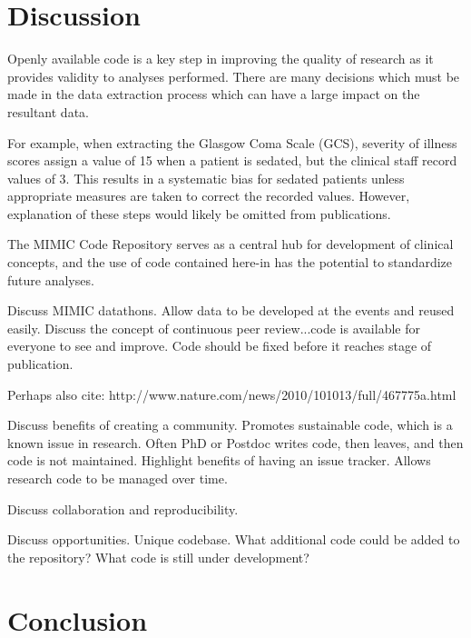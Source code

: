 \documentclass{bioinfo}
\begin{document}
\section{Discussion}



Openly available code is a key step in improving the quality of research as it provides validity to analyses performed. There are many decisions which must be made in the data extraction process which can have a large impact on the resultant data. 

For example, when extracting the Glasgow Coma Scale (GCS), severity of illness scores assign a value of 15 when a patient is sedated, but the clinical staff record values of 3. This results in a systematic bias for sedated patients unless appropriate measures are taken to correct the recorded values. However, explanation of these steps would likely be omitted from publications. 

The MIMIC Code Repository serves as a central hub for development of clinical concepts, and the use of code contained here-in has the potential to standardize future analyses.

Discuss MIMIC datathons. Allow data to be developed at the events and reused easily. Discuss the concept of continuous peer review...code is available for everyone to see and improve. Code should be fixed before it reaches stage of publication.

Perhaps also cite: http://www.nature.com/news/2010/101013/full/467775a.html

Discuss benefits of creating a community. Promotes sustainable code, which is a known issue in research. Often PhD or Postdoc writes code, then leaves, and then code is not maintained. Highlight benefits of having an issue tracker. Allows research code to be managed over time. 

Discuss collaboration and reproducibility.

Discuss opportunities. Unique codebase. What additional code could be added to the repository? What code is still under development?

\section{Conclusion}
\end{document}
